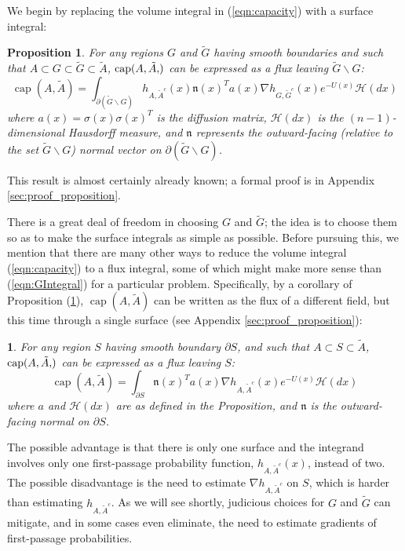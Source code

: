 \documentclass[12pt, nofootinbib,english, amsmath, amssymb, aps, priprint, graphicx,floatfix]{revtex4-1}
\newtheorem{proposition}{Proposition}
\theoremstyle{plain}
\theoremstyle{definition}
\theoremstyle{plain}
\newtheorem{cor}[thm]{\protect\corollaryname}
\newcommand{\normal}{{\mathfrak{n}}}
\newcommand{\capac}[2]{\ensuremath{\operatorname{cap}}(#1,#2)}
\newcommand{\hausdorffmeasure}{\mathscr{H}(dx)}
\providecommand{\corollaryname}{Corollary}
\newcommand{\tA}{{\tilde A}}
\begin{document}
We begin by replacing the volume integral in (\ref{eqn:capacity}) with a surface integral:

\begin{proposition}
\label{prop:flux}
For any regions $G$ and $\tilde{G}$ having smooth boundaries and such that $A\subset G \subset \tilde G \subset \tilde A$, $\capac{A,\tA}$ can be expressed as a flux leaving $\tilde G \backslash G$:
\begin{equation}
\label{eqn:GIntegral}
\ensuremath{\operatorname{cap}} (A, \tilde{A}) = \int_{\partial (\tilde G \backslash G)}  h_{A, \tilde{A}^c} (x)   \normal(x)^T a (x) \nabla h_{G, \tilde{G}^c} (x)e^{- U (x)} \hausdorffmeasure
\end{equation}
where $a(x)=\sigma(x)\sigma(x)^T$ is the diffusion matrix, $\hausdorffmeasure$ is the $(n-1)$-dimensional Hausdorff measure, and $\normal$ represents the outward-facing (relative to the set $\tilde G \backslash G$) normal vector on $\partial (\tilde G \backslash G)$.
\end{proposition}
\noindent This result is almost certainly already known; a formal proof is in Appendix \ref{sec:proof_proposition}.

There is a great deal of freedom in choosing $G$ and $\tilde G$; the idea is to choose them so as to make the surface integrals as simple as possible. Before pursuing this, we mention that there are many other ways to reduce the volume integral (\ref{eqn:capacity}) to a flux integral, some of which might make more sense than (\ref{eqn:GIntegral}) for a particular problem. Specifically, by a corollary of 
Proposition (\ref{prop:flux}), $\capac{A}{\tilde A}$ can be written as the flux of a different field, but this time through a single surface (see Appendix \ref{sec:proof_proposition}):
\begin{cor}
\label{cor:flux}
For any region $S$ having smooth boundary $\partial S$, and such that $A\subset S \subset \tilde A$, $\capac{A,\tA}$ can be expressed as a flux leaving $S$:
\begin{equation}
\ensuremath{\operatorname{cap}} (A, \tilde{A}) = \int_{\partial S}   \normal(x)^T a (x) \nabla h_{A, \tilde{A}^c} (x)e^{- U (x)} \hausdorffmeasure
\end{equation}
where $a$ and $\hausdorffmeasure$ are as defined in the Proposition, and  $\normal$ is the outward-facing normal on $\partial S$.
\end{cor}
\noindent
The possible advantage is that there is only one surface and the integrand involves only one first-passage probability function, $h_{A, \tilde{A}^c} (x)$, instead of two. The possible disadvantage is the need to estimate $\nabla h_{A, \tilde{A}^c}$ on $S$, which is harder than estimating $h_{A, \tilde{A}^c}$. As we will see shortly, judicious choices for $G$ and $\tilde G$ can mitigate, and in some cases even eliminate, the need to estimate gradients of first-passage probabilities.
\end{document}

